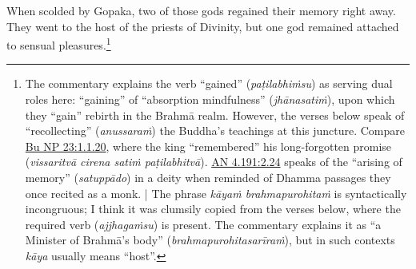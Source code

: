 \documentclass[12pt,openany]{book}%
\begin{document}
When scolded by Gopaka, two of those gods regained their memory right away. They went to the host of the priests of Divinity, but one god remained attached to sensual pleasures.\footnote{The commentary explains the verb “gained” (\textit{\textsanskrit{paṭilabhiṁsu}}) as serving dual roles here: “gaining” of “absorption mindfulness” (\textit{\textsanskrit{jhānasatiṁ}}), upon which they “gain” rebirth in the \textsanskrit{Brahmā} realm. However, the verses below speak of “recollecting” (\textit{\textsanskrit{anussaraṁ}}) the Buddha’s teachings at this juncture. Compare \href{https://suttacentral.net/pli-tv-bu-vb-np23/en/sujato\#1.1.20}{Bu NP 23:1.1.20}, where the king “remembered” his long-forgotten promise (\textit{\textsanskrit{vissaritvā} cirena \textsanskrit{satiṁ} \textsanskrit{paṭilabhitvā}}). \href{https://suttacentral.net/an4.191/en/sujato\#2.24}{AN 4.191:2.24} speaks of the “arising of memory” (\textit{\textsanskrit{satuppādo}}) in a deity when reminded of Dhamma passages they once recited as a monk. | The phrase \textit{\textsanskrit{kāyaṁ} \textsanskrit{brahmapurohitaṁ}} is syntactically incongruous; I think it was clumsily copied from the verses below, where the required verb (\textit{\textsanskrit{ajjhagaṁsu}}) is present. The commentary explains it as “a Minister of \textsanskrit{Brahmā}’s body” (\textit{\textsanskrit{brahmapurohitasarīraṁ}}), but in such contexts \textit{\textsanskrit{kāya}} usually means “host”. } 
\end{document}
